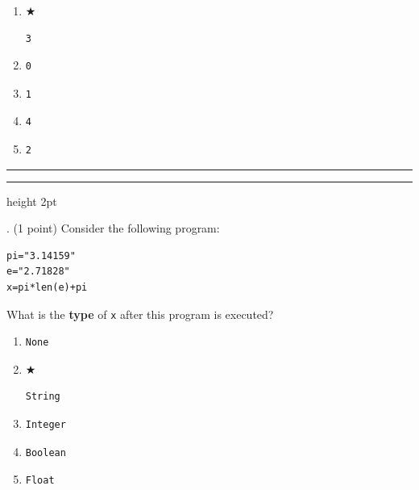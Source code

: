 \documentclass{article}
\begin{document}
\begin{enumerate}
\item[(A)] $\bigstar$ 
\begin{verbatim}3\end{verbatim}

\item[(B)]
\begin{verbatim}0\end{verbatim}

\item[(C)]
\begin{verbatim}1\end{verbatim}

\item[(D)]
\begin{verbatim}4\end{verbatim}

\item[(E)]
\begin{verbatim}2\end{verbatim}

\end{enumerate}

\vspace*{2em}
\hrule
\vspace{2em}

\vspace{2em}
\hrule height 2pt


\newpage
{}. (1 point)
Consider the following program:
\begin{verbatim}
pi="3.14159"
e="2.71828"
x=pi*len(e)+pi
\end{verbatim}
What is the \textbf{type} of \texttt{x} after this program is executed?


\begin{enumerate}
\item[(A)]
\begin{verbatim}None\end{verbatim}

\item[(B)] $\bigstar$ 
\begin{verbatim}String\end{verbatim}

\item[(C)]
\begin{verbatim}Integer\end{verbatim}

\item[(D)]
\begin{verbatim}Boolean\end{verbatim}

\item[(E)]
\begin{verbatim}Float\end{verbatim}

\end{enumerate}
\end{document}
